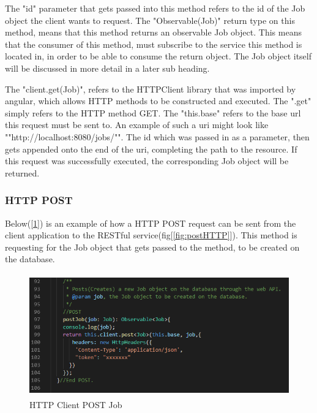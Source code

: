 \bigskip

The "id" parameter that gets passed into this method refers to the id of the Job object the client wants to request. The "Observable(Job)" return type on this method, means that this method returns an observable Job object. This means that the consumer of this method, must subscribe to the service this method is located in, in order to be able to consume the return object. The Job object itself will be discussed in more detail in a later sub heading.

The "client.get(Job)", refers to the HTTPClient library that was imported by angular, which allows HTTP methods to be constructed and executed. The ".get" simply refers to the HTTP method GET. The "this.base"
refers to the base url this request must be sent to. An example of such a uri might look like ""http://localhost:8080/jobs/"". The id which was passed in as a parameter, then gets appended onto the end of the uri, completing the path to the resource. If this request was successfully executed, the corresponding Job object will be returned.

\subsubsection{HTTP POST}

Below([\ref{fig:POST}]) is an example of how a HTTP POST request can be sent from the client application to the RESTful service(fig[\ref{fig:postHTTP}]). This method is requesting for the Job object that gets passed to the method, to be created on the database.

\begin{figure}[H]
    \centering
    \includegraphics[width=\textwidth, height=150pt]{DesignImages/ClientPOST.PNG}
    \caption{HTTP Client POST Job}
    \label{fig:POST}
\end{figure}

\bigskip

